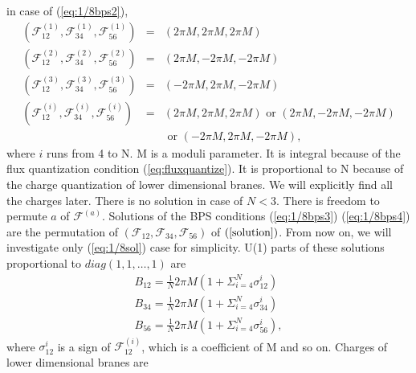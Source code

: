 \documentclass[a4paper,12pt]{article}
\begin{document}
in case of (\ref{eq:1/8bps2}), 
\begin{eqnarray}
(\mathcal{F}_{12}^{(1)},\mathcal{F}_{34}^{(1)},\mathcal{F}_{56}^{(1)})&=&(2 \pi M,2 \pi M,2 \pi M) \nonumber \\
(\mathcal{F}_{12}^{(2)},\mathcal{F}_{34}^{(2)},\mathcal{F}_{56}^{(2)})&=&(2 \pi M,-2 \pi M,-2 \pi M) \nonumber \\
(\mathcal{F}_{12}^{(3)},\mathcal{F}_{34}^{(3)},\mathcal{F}_{56}^{(3)})&=&(-2 \pi M,2 \pi M,-2 \pi M) \nonumber \\
(\mathcal{F}_{12}^{(i)},\mathcal{F}_{34}^{(i)},\mathcal{F}_{56}^{(i)})&=&(2 \pi M,2 \pi M,2 \pi M) \mbox{ or } (2 \pi M,-2 \pi M,-2 \pi M) \nonumber \\ 
&&\mbox{ or } (-2 \pi M,2 \pi M,-2 \pi M), \label{solution} 
\end{eqnarray}
where $i$ runs from 4 to N. M is a moduli parameter. It is integral because of the flux quantization condition (\ref{eq:fluxquantize}). It is proportional to N because of the charge quantization of lower dimensional branes. We will explicitly find all the charges later. There is no solution in case of $N < 3$. There is freedom to permute $a$ of $\mathcal{F}^{(a)}$. Solutions of the BPS conditions (\ref{eq:1/8bps3}) (\ref{eq:1/8bps4}) are the permutation of $(\mathcal{F}_{12}, \mathcal{F}_{34}, \mathcal{F}_{56} )$ of $(\ref{solution})$. From now on, we will investigate only (\ref{eq:1/8sol}) case for simplicity. U(1) parts of these solutions proportional to $diag(1,1,\ldots,1)$ are
\begin{eqnarray}
B_{12}=\frac{1}{N}2 \pi M(1+\Sigma_{i=4}^N\sigma_{12}^i) \nonumber \\
B_{34}=\frac{1}{N}2 \pi M(1+\Sigma_{i=4}^N\sigma_{34}^i) \nonumber \\
B_{56}=\frac{1}{N}2 \pi M(1+\Sigma_{i=4}^N\sigma_{56}^i), \nonumber 
\end{eqnarray}
where $\sigma_{12}^i$ is a sign of $\mathcal{F}_{12}^{(i)}$, which is a coefficient of M and so on. Charges of lower dimensional branes are
\end{document}
